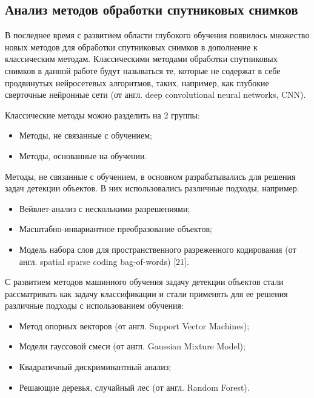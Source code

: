 \documentclass[14pt, russian]{scrartcl}
\begin{document}
\subsection{Анализ методов обработки спутниковых снимков}

В последнее время с развитием области глубокого обучения появилось множество новых методов для обработки спутниковых снимков в дополнение к классическим методам. Классическими методами обработки спутниковых снимков в данной работе будут называться те, которые не содержат в себе продвинутых нейросетевых алгоритмов, таких, например, как глубокие сверточные нейронные сети (от англ. deep convolutional neural networks, CNN).

Классические методы можно разделить на 2 группы:

\begin{itemize}
    \item Методы, не связанные с обучением;
    \item Методы, основанные на обучении.
\end{itemize}

Методы, не связанные с обучением, в основном разрабатывались для решения задач детекции объектов. В них использовались различные подходы, например:

\begin{itemize}
    \item Вейвлет-анализ с несколькими разрешениями;
    \item Масштабно-инвариантное преобразование объектов;
    \item Модель набора слов для пространственного разреженного кодирования (от англ. spatial sparse coding bag-of-words) [21].
\end{itemize}

С развитием методов машинного обучения задачу детекции объектов стали рассматривать как задачу классификации и стали применять для ее решения различные подходы с использованием обучения:

\begin{itemize}
    \item Метод опорных векторов (от англ. Support Vector Machines);
    \item Модели гауссовой смеси (от англ. Gaussian Mixture Model);
    \item Квадратичный дискриминантный анализ;
    \item Решающие деревья, случайный лес (от англ. Random Forest).
\end{itemize}
\end{document}
